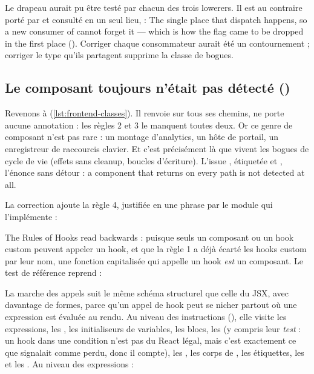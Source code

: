 \begin{decision}
Le drapeau aurait pu être testé par chacun des trois lowerers. Il est au contraire porté par  et consulté en un seul lieu,  : \og The single place that dispatch happens, so a new consumer of  cannot forget it — which is how the flag came to be dropped in the first place\fg{} (). Corriger chaque consommateur aurait été un contournement ; corriger le type qu'ils partagent supprime la classe de bogues.
\end{decision}

\subsection{Le composant toujours  n'était pas détecté ()}

Revenons à  (\cref{lst:frontend-classes}). Il renvoie  sur tous ses chemins, ne porte aucune annotation : les règles 2 et 3 le manquent toutes deux. Or ce genre de composant n'est pas rare : un montage d'analytics, un hôte de portail, un enregistreur de raccourcis clavier. Et c'est précisément là que vivent les bogues de cycle de vie (effets sans cleanup, boucles d'écriture). L'issue , étiquetée  et , l'énonce sans détour : \og a component that returns  on every path is not detected at all\fg{}.

La correction ajoute la règle 4, justifiée en une phrase par le module qui l'implémente :


\og The Rules of Hooks read backwards\fg{} : puisque seuls un composant ou un hook custom peuvent appeler un hook, et que la règle 1 a déjà écarté les hooks custom par leur nom, une fonction capitalisée qui appelle un hook \emph{est} un composant. Le test de référence reprend  :


La marche des appels suit le même schéma structurel que celle du JSX, avec davantage de formes, parce qu'un appel de hook peut se nicher partout où une expression est évaluée au rendu. Au niveau des instructions (), elle visite les expressions, les , les initialiseurs de variables, les blocs, les  (y compris leur \emph{test} : un hook dans une condition n'est pas du React légal, mais c'est exactement ce que  signalait comme perdu, donc il compte), les , les corps de , les étiquettes, les  et les . Au niveau des expressions :


